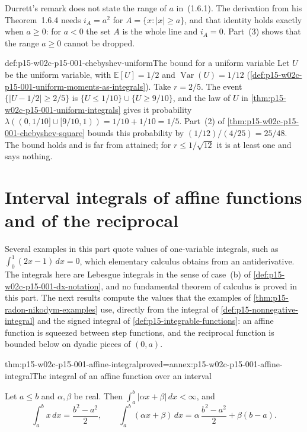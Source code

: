 Durrett's remark does not state the range of \(a\) in~(1.6.1). The
derivation from his Theorem~1.6.4 needs \(i_A=a^2\) for
\(A=\{x:|x|\geq a\}\), and that identity holds exactly when \(a\geq0\):
for \(a<0\) the set \(A\) is the whole line and \(i_A=0\). Part~(3) shows
that the range \(a\geq0\) cannot be dropped.

\begin{hbexample}{def:p15-w02c-p15-001-chebyshev-uniform}{The bound for a uniform variable}
Let \(U\) be the uniform variable, with \(\mathbb E[U]=1/2\) and
\(\operatorname{Var}(U)=1/12\)
(\cref{def:p15-w02c-p15-001-uniform-moments-as-integrals}). Take
\(r=2/5\). The event \(\{|U-1/2|\geq2/5\}\) is
\(\{U\leq1/10\}\cup\{U\geq9/10\}\), and the law of \(U\) in
\cref{thm:p15-w02c-p15-001-uniform-integrals} gives it probability
\(\lambda((0,1/10]\cup[9/10,1))=1/10+1/10=1/5\). Part~(2) of
\cref{thm:p15-w02c-p15-001-chebyshev-square} bounds this probability by
\((1/12)/(4/25)=25/48\). The bound holds and is far from attained; for
\(r\leq1/\sqrt{12}\) it is at least one and says nothing.
\end{hbexample}

\section{Interval integrals of affine functions and of the reciprocal}
\label{sec:p15-w02c-p15-001-affine-integrals}

Several examples in this part quote values of one-variable integrals,
such as \(\int_0^1(2x-1)\,dx=0\), which elementary calculus obtains from an
antiderivative. The integrals here are Lebesgue integrals in the sense of
case~(b) of \cref{def:p15-w02c-p15-001-dx-notation}, and no fundamental
theorem of calculus is proved in this part. The next results compute the
values that the examples of \cref{thm:p15-radon-nikodym-examples} use,
directly from the integral of \cref{def:p15-nonnegative-integral} and the
signed integral of \cref{def:p15-integrable-functions}: an affine function
is squeezed between step functions, and the reciprocal function is
bounded below on dyadic pieces of \((0,a)\).

\begin{hblemma}{thm:p15-w02c-p15-001-affine-integral}{proved=annex:p15-w02c-p15-001-affine-integral}{The integral of an affine function over an interval}
\par\nobreak
Let \(a\leq b\) and \(\alpha,\beta\) be real. Then
\(\int_a^b|\alpha x+\beta|\,dx<\infty\), and
\[
 \int_a^bx\,dx=\frac{b^2-a^2}2,\qquad
 \int_a^b(\alpha x+\beta)\,dx=\alpha\,\frac{b^2-a^2}2+\beta(b-a).
\]
\end{hblemma}

